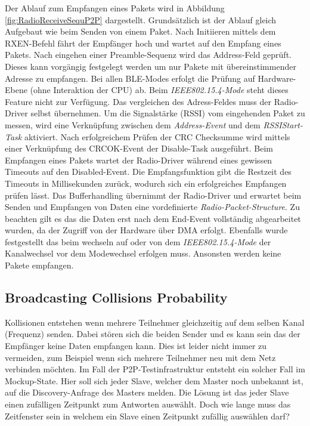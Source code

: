 Der Ablauf zum Empfangen eines Pakets wird in Abbildung \ref{fig:RadioReceiveSequP2P} dargestellt. Grundsätzlich ist der Ablauf gleich Aufgebaut wie beim Senden von einem Paket. Nach Initiieren mittels dem RXEN-Befehl fährt der Empfänger hoch und wartet auf den Empfang eines Pakets. Nach eingehen einer Preamble-Sequenz wird das Address-Feld geprüft. Dieses kann vorgängig festgelegt werden um nur Pakete mit übereinstimmender Adresse zu empfangen. Bei allen BLE-Modes erfolgt die Prüfung auf Hardware-Ebene (ohne Interaktion der CPU) ab. Beim \textit{IEEE802.15.4-Mode} steht dieses Feature nicht zur Verfügung. Das vergleichen des Adress-Feldes muss der Radio-Driver selbst übernehmen. Um die Signalstärke (RSSI) vom eingehenden Paket zu messen, wird eine Verknüpfung zwischen dem \textit{Address-Event} und dem \textit{RSSIStart-Task} aktiviert. Nach erfolgreichem Prüfen der CRC Checksumme wird mittels einer Verknüpfung des CRCOK-Event der Disable-Task ausgeführt. Beim Empfangen eines Pakets wartet der Radio-Driver während eines gewissen Timeouts auf den Disabled-Event. Die Empfangsfunktion gibt die Restzeit des Timeouts in Millisekunden zurück, wodurch sich ein erfolgreiches Empfangen prüfen lässt. Das Bufferhandling übernimmt der Radio-Driver und erwartet beim Senden und Empfangen von Daten eine vordefinierte \textit{Radio-Packet-Structure}. Zu beachten gilt es das die Daten erst nach dem End-Event  vollständig abgearbeitet wurden, da der Zugriff von der Hardware über DMA erfolgt. Ebenfalls wurde festgestellt das beim wechseln auf oder von dem \textit{IEEE802.15.4-Mode} der Kanalwechsel vor dem Modewechsel erfolgen muss. Ansonsten werden keine Pakete empfangen. \cite{nordic_semi_nrf_infocenter_radio_receive_sequence_2020}


\subsection{Broadcasting Collisions Probability}\label{sec:BroadcastingCollissionsProbability}

Kollisionen entstehen wenn mehrere Teilnehmer gleichzeitig auf dem selben Kanal (Frequenz) senden. Dabei stören sich die beiden Sender und es kann sein das der Empfänger keine Daten empfangen kann. Dies ist leider nicht immer zu vermeiden, zum Beispiel wenn sich mehrere Teilnehmer neu mit dem Netz verbinden möchten. Im Fall der P2P-Testinfrastruktur entsteht ein solcher Fall im Mockup-State. Hier soll sich jeder Slave, welcher dem Master noch unbekannt ist, auf die Discovery-Anfrage des Masters melden. Die Lösung ist das jeder Slave einen zufälligen Zeitpunkt zum Antworten auswählt. Doch wie lange muss das Zeitfenster sein in welchem ein Slave einen Zeitpunkt zufällig auswählen darf? \\

